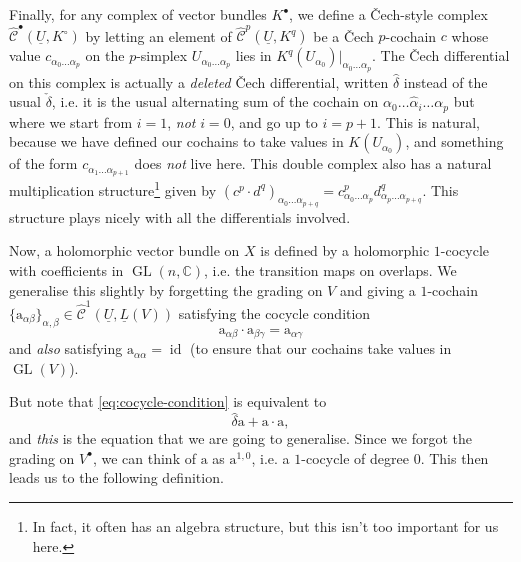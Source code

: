 \documentclass[11pt,notitlepage]{article}
\numberwithin{equation}{subsection}
\DeclareMathOperator{\GL}{GL}
\DeclareMathOperator{\id}{id}
\renewcommand{\C}{\mathscr{C}}
\begin{document}
                Finally, for any complex of vector bundles $K^\bullet$, we define a Čech-style complex $\hat{\C}^\bullet(\underline{U},K^\circ)$ by letting an element of $\hat{\C}^p(\underline{U},K^q)$ be a Čech $p$-cochain $c$ whose value $c_{\alpha_0\ldots\alpha_p}$ on the $p$-simplex $U_{\alpha_0\ldots\alpha_p}$ lies in $K^q(U_{\alpha_0})|_{\alpha_0\ldots\alpha_p}$.
                The Čech differential on this complex is actually a \textit{deleted} Čech differential, written $\hat{\delta}$ instead of the usual $\check{\delta}$, i.e. it is the usual alternating sum of the cochain on $\alpha_0\ldots\hat{\alpha}_i\ldots\alpha_p$ but where we start from $i=1$, \emph{not} $i=0$, and go up to $i=p+1$.
                This is natural, because we have defined our cochains to take values in $K(U_{\alpha_0})$, and something of the form $c_{\alpha_1\ldots\alpha_{p+1}}$ does \textit{not} live here.
                This double complex also has a natural multiplication structure\footnote{In fact, it often has an algebra structure, but this isn't too important for us here.} given by $(c^p\cdot d^q)_{\alpha_0\ldots\alpha_{p+q}} = c^p_{\alpha_0\ldots\alpha_p}d^q_{\alpha_p\ldots\alpha_{p+q}}$.
                This structure plays nicely with all the differentials involved.

                \bigskip

                Now, a holomorphic vector bundle on $X$ is defined by a holomorphic $1$-cocycle with coefficients in $\GL(n,\mathbb{C})$, i.e. the transition maps on overlaps.
                We generalise this slightly by forgetting the grading on $V$ and giving a $1$-cochain $\{\mathrm{a}_{\alpha\beta}\}_{\alpha,\beta} \in \hat{\C}^1(\underline{U},\underline{L}(V))$ satisfying the cocycle condition
                \begin{equation}\label{eq:cocycle-condition}
                    \mathrm{a}_{\alpha\beta}\cdot\mathrm{a}_{\beta\gamma}=\mathrm{a}_{\alpha\gamma}
                \end{equation}
                and \textit{also} satisfying $\mathrm{a}_{\alpha\alpha}=\id$ (to ensure that our cochains take values in $\GL(V)$).

                But note that \cref{eq:cocycle-condition} is equivalent to
                \begin{equation}
                    \hat{\delta}\mathrm{a}+\mathrm{a}\cdot\mathrm{a},
                \end{equation}
                and \textit{this} is the equation that we are going to generalise.
                Since we forgot the grading on $V^\bullet$, we can think of $\mathrm{a}$ as $\mathrm{a}^{1,0}$, i.e. a $1$-cocycle of degree $0$.
                This then leads us to the following definition.
\end{document}
